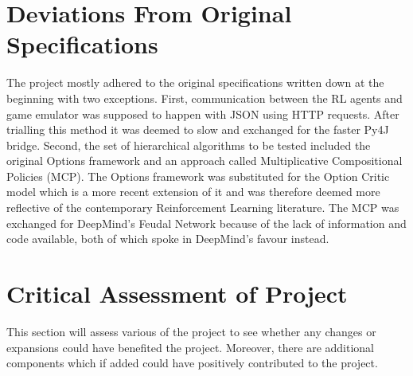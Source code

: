 \documentclass[notitlepage,a4paper,11pt]{article}
\begin{document}
\section{Deviations From Original Specifications}
The project mostly adhered to the original specifications written down at the beginning with two exceptions. First, communication between the RL agents and game emulator was supposed to happen with JSON using HTTP requests. After trialling this method it was deemed to slow and exchanged for the faster Py4J bridge. Second, the set of hierarchical algorithms to be tested included the original Options framework and an approach called Multiplicative Compositional Policies (MCP). The Options framework was substituted for the Option Critic model which is a more recent extension of it and was therefore deemed more reflective of the contemporary Reinforcement Learning literature. The MCP was exchanged for DeepMind's Feudal Network because of the lack of information and code available, both of which spoke in DeepMind's favour instead.


\section{Critical Assessment of Project}
This section will assess various of the project to see whether any changes or expansions could have benefited the project. Moreover, there are additional components which if added could have positively contributed to the project. 
\end{document}
